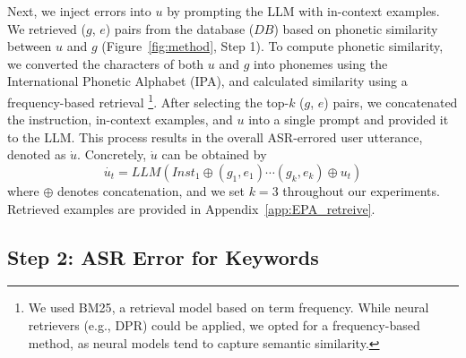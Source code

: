 Next, we inject errors into $u$ by prompting the LLM with in-context examples. We retrieved ($g$, $e$) pairs from the database ($DB$) based on phonetic similarity between $u$ and $g$ (Figure~\ref{fig:method}, Step 1). To compute phonetic similarity, we converted the characters of both $u$ and $g$ into phonemes using the International Phonetic Alphabet (IPA), and calculated similarity using a frequency-based retrieval \footnote{We used BM25\cite{bm25}, a retrieval model based on term frequency. While neural retrievers (e.g., DPR\cite{DPR}) could be applied, we opted for a frequency-based method, as neural models tend to capture semantic similarity.}. After selecting the top-$k$ ($g$, $e$) pairs, we concatenated the instruction, in-context examples, and $u$ into a single prompt and provided it to the LLM. This process results in the overall ASR-errored user utterance, denoted as $\dot{u}$. Concretely, $\dot{u}$ can be obtained by 
 \begin{equation}
    \dot{u_t} = LLM(Inst_1 \oplus (g_1, e_1)\cdots(g_k, e_k)\oplus u_t)
\end{equation}
where $\oplus$ denotes concatenation, and we set $k=3$ throughout our experiments.  Retrieved examples are provided in Appendix~\ref{app:EPA_retreive}.

\subsection{Step 2: ASR Error for Keywords}
\label{sec:method_step2}





